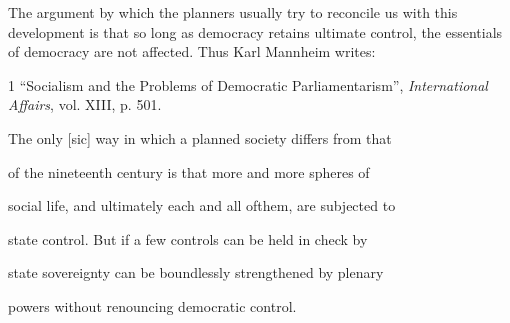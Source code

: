 \documentclass[11pt,openany]{book}
\begin{document}
\begin{center}\textasteriskcentered\hspace{0.9em}\textasteriskcentered\hspace{0.9em}\textasteriskcentered\end{center}

\begin{center}\textasteriskcentered\hspace{0.9em}\textasteriskcentered\hspace{0.9em}\textasteriskcentered\end{center}

\begin{center}\textasteriskcentered\hspace{0.9em}\textasteriskcentered\hspace{0.9em}\textasteriskcentered\end{center}

\begin{center}\textasteriskcentered\hspace{0.9em}\textasteriskcentered\hspace{0.9em}\textasteriskcentered\end{center}

\begin{center}\textasteriskcentered\hspace{0.9em}\textasteriskcentered\hspace{0.9em}\textasteriskcentered\end{center}

The argument by which the planners usually try to reconcile us with this development is that so long as democracy retains ultimate control, the essentials of democracy are not affected. Thus Karl Mannheim writes:

1 ``Socialism and the Problems of Democratic Parliamentarism'', \emph{International Affairs}, vol. XIII, p. 501.

The only [sic] way in which a planned society differs from that

of the nineteenth century is that more and more spheres of

social life, and ultimately each and all ofthem, are subjected to

state control. But if a few controls can be held in check by

state sovereignty can be boundlessly strengthened by plenary

powers without renouncing democratic control.
\end{document}

